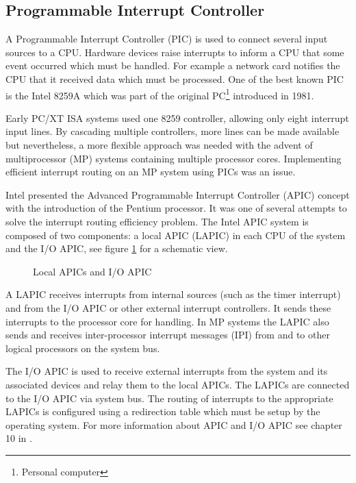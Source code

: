 \subsection{Programmable Interrupt Controller}\label{subsec:apic}
A Programmable Interrupt Controller (PIC) is used to connect several
input sources to a CPU. Hardware devices raise interrupts to inform a CPU that
some event occurred which must be handled. For example a network card notifies
the CPU that it received data which must be processed. One of the best known PIC
is the Intel 8259A which was part of the original PC\footnote{Personal
computer} introduced in 1981.

Early PC/XT ISA systems used one 8259 controller, allowing only eight
interrupt input lines. By cascading multiple controllers, more lines can be made
available but nevertheless, a more flexible approach was needed with the advent
of multiprocessor (MP) systems containing multiple processor cores.
Implementing efficient interrupt routing on an MP system using PICs was an
issue.

Intel presented the Advanced Programmable Interrupt Controller
(APIC) concept with the introduction of the Pentium processor. It
was one of several attempts to solve the interrupt routing efficiency problem.
The Intel APIC system is composed of two components: a local APIC
(LAPIC) in each CPU of the system and the I/O APIC, see figure
\ref{fig:apic} for a schematic view.

\begin{figure}[h]
	\centering
	
	\caption{Local APICs and I/O APIC}
	\label{fig:apic}
\end{figure}

A LAPIC receives interrupts from internal sources (such as the timer interrupt)
and from the I/O APIC or other external interrupt controllers. It sends these
interrupts to the processor core for handling. In MP systems the LAPIC also
sends and receives inter-processor interrupt messages (IPI) from and
to other logical processors on the system bus.

The I/O APIC is used to receive external interrupts from the system and its
associated devices and relay them to the local APICs. The LAPICs are connected
to the I/O APIC via system bus. The routing of interrupts to the appropriate
LAPICs is configured using a redirection table which must be setup by the
operating system. For more information about APIC and I/O APIC see chapter 10 in
\cite{IntelSDM}.
